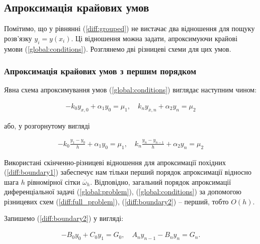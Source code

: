 \subsection{Апроксимація крайових умов}

Помітимо, що у рівнянні (\ref{diff:grouped}) не вистачає два відношення для пощуку розв'язку \( y_i = y(x_i)\). Ці відношення можна задати, апроксимуючи крайові умови (\ref{global:conditions}). Розглянемо дві різницеві схеми для цих умов.

\subsubsection{Апроксимація крайових умов з першим порядком}\label{approx:O(h)}

Явна схема апроксимування умов (\ref{global:conditions}) виглядає наступним чином:

\begin{equation}
\begin{split} \label{diff:boundary1}
-k_0 y_{x,0} + \alpha_1 y_0 = \mu_1, \quad
k_n y_{\overline{x}, n} + \alpha_2 y_n = \mu_2
\end{split}
\end{equation}

\newpage

або, у розгорнутому вигляді

\begin{equation}
\begin{split} \label{diff:boundary2}
-k_0 \frac{y_1 - y_0}{h} + \alpha_1 y_0 = \mu_1, \quad
k_n \frac{y_n - y_{n-1}}{h} + \alpha_2 y_n = \mu_2
\end{split}
\end{equation}

Використані скінченно-різницеві відношення для апроксимації похідних (\ref{diff:boundary1}) забеспечує нам тільки перший порядок апроксимації відносно шага \(h\) рівномірної сітки \(\overline{\omega}_h\). Відповідно, загальний порядок апроксимації диференціальної задачі (\ref{global:problem}), (\ref{global:conditions}) за допомогою різницевих схем (\ref{diff:full_problem}), (\ref{diff:boundary2}) -- перший, тобто \(O(h)\).

\bigskip

Запишемо (\ref{diff:boundary2}) у вигляді:

\begin{equation}
\begin{split} \label{diff:boundary_general}
-B_0y_0 + C_0y_1 = G_0, \quad A_ny_{n-1} - B_ny_n = G_n.
\end{split}
\end{equation}

